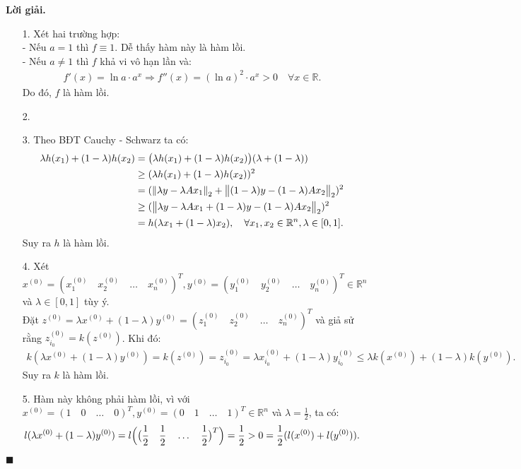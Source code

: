 \documentclass[12pt]{article}
\newcommand{\R}{\mathbb{R}}
\newenvironment{solution}{%
     \setlength\parindent{0pt}\par\medskip\textbf{Lời giải.}\quad}{%
     \hfill\tiny$\blacksquare$\par\medskip}
\begin{document}
    \begin{solution}
        \begin{enumerate}
            \item[1.] Xét hai trường hợp:
            \\
            - Nếu $a = 1$ thì $f \equiv 1$. Dễ thấy hàm này là hàm lồi.
            \\
            - Nếu $a \neq 1$ thì $f$ khả vi vô hạn lần và:
            \begin{align*}
                f'(x) = \ln a \cdot a^x \Rightarrow f''(x) = (\ln a)^2 \cdot a^x > 0 \quad \forall x \in \R.
            \end{align*}
            Do đó, $f$ là hàm lồi.
            \item[2.] 
            \item[3.] Theo BĐT Cauchy - Schwarz ta có:
            \begin{align*}
                \lambda h(x_1) + (1 - \lambda)h(x_2) &= \bigl(\lambda h(x_1) + (1 - \lambda)h(x_2)\bigr) (\lambda + (1 - \lambda))\\
                &\geq (\lambda h(x_1) + (1 - \lambda)h(x_2))^2\\
                &= (\norm{\lambda y - \lambda Ax_1}_2 + \norm{(1 - \lambda)y - (1 - \lambda)Ax_2}_2)^2\\
                &\geq (\norm{\lambda y - \lambda Ax_1 + (1 - \lambda)y - (1 - \lambda)Ax_2}_2)^2\\
                &= h(\lambda x_1 + (1 - \lambda)x_2), \quad \forall x_1, x_2 \in \R^n, \lambda \in [0, 1].
            \end{align*}
            Suy ra $h$ là hàm lồi.
            \item[4.] Xét $x^{(0)} = (x_1^{(0)} \quad x_2^{(0)} \quad \ldots \quad x_n^{(0)})^T, y^{(0)} = (y_1^{(0)} \quad y_2^{(0)} \quad \ldots \quad y_n^{(0)})^T \in \R^n$ và $\lambda \in [0, 1]$ tùy ý.
            \\
            Đặt $z^{(0)} = \lambda x^{(0)} + (1 - \lambda)y^{(0)} = (z_1^{(0)} \quad z_2^{(0)} \quad \ldots \quad z_n^{(0)})^T$ và giả sử rằng $z_{i_0}^{(0)} = k(z^{(0)})$. Khi đó:
            \begin{align*}
                k(\lambda x^{(0)} + (1 - \lambda)y^{(0)}) = k(z^{(0)}) = z_{i_0}^{(0)} = \lambda x_{i_0}^{(0)} + (1 - \lambda)y_{i_0}^{(0)} \leq \lambda k(x^{(0)}) + (1 - \lambda)k(y^{(0)}).
            \end{align*}
            Suy ra $k$ là hàm lồi.
            \item[5.] Hàm này không phải hàm lồi, vì với $x^{(0)} = (1 \quad 0 \quad \ldots \quad 0)^T, y^{(0)} = (0 \quad 1 \quad \ldots \quad 1)^T \in \R^n$ và $\lambda = \frac{1}{2}$, ta có:
            \begin{align*}
                l(\lambda x^{(0)} + (1 - \lambda)y^{(0)}) = l \Bigl(\bigl(\frac{1}{2} \quad \frac{1}{2} \quad \ldots \quad \frac{1}{2}\bigr)^T\Bigr) = \frac{1}{2} > 0 = \frac{1}{2}(l(x^{(0)}) + l(y^{(0)})).
            \end{align*}
        \end{enumerate}
    \end{solution}
\end{document}
